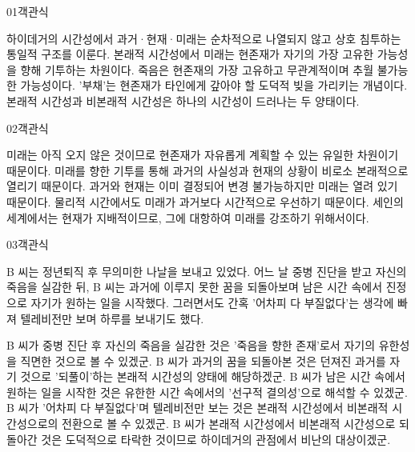 \documentclass[fs85,seriesWit]{korfarm-base}
\begin{document}
\kfBeginMC
\begin{kfQBlock}{01}{객관식}
\begin{kfChoices}
\kfChoice 하이데거의 시간성에서 과거·현재·미래는 순차적으로 나열되지 않고 상호 침투하는 통일적 구조를 이룬다.
\kfChoice 본래적 시간성에서 미래는 현존재가 자기의 가장 고유한 가능성을 향해 기투하는 차원이다.
\kfChoice 죽음은 현존재의 가장 고유하고 무관계적이며 추월 불가능한 가능성이다.
\kfChoice '부채'는 현존재가 타인에게 갚아야 할 도덕적 빚을 가리키는 개념이다.
\kfChoice 본래적 시간성과 비본래적 시간성은 하나의 시간성이 드러나는 두 양태이다.
\end{kfChoices}
\end{kfQBlock}

\begin{kfQBlock}{02}{객관식}
\begin{kfChoices}
\kfChoice 미래는 아직 오지 않은 것이므로 현존재가 자유롭게 계획할 수 있는 유일한 차원이기 때문이다.
\kfChoice 미래를 향한 기투를 통해 과거의 사실성과 현재의 상황이 비로소 본래적으로 열리기 때문이다.
\kfChoice 과거와 현재는 이미 결정되어 변경 불가능하지만 미래는 열려 있기 때문이다.
\kfChoice 물리적 시간에서도 미래가 과거보다 시간적으로 우선하기 때문이다.
\kfChoice 세인의 세계에서는 현재가 지배적이므로, 그에 대항하여 미래를 강조하기 위해서이다.
\end{kfChoices}
\end{kfQBlock}

\begin{kfQBlock}{03}{객관식}
\begin{kfEvidence}B 씨는 정년퇴직 후 무의미한 나날을 보내고 있었다. 어느 날 중병 진단을 받고 자신의 죽음을 실감한 뒤, B 씨는 과거에 이루지 못한 꿈을 되돌아보며 남은 시간 속에서 진정으로 자기가 원하는 일을 시작했다. 그러면서도 간혹 '어차피 다 부질없다'는 생각에 빠져 텔레비전만 보며 하루를 보내기도 했다.\end{kfEvidence}
\begin{kfChoices}
\kfChoice B 씨가 중병 진단 후 자신의 죽음을 실감한 것은 '죽음을 향한 존재'로서 자기의 유한성을 직면한 것으로 볼 수 있겠군.
\kfChoice B 씨가 과거의 꿈을 되돌아본 것은 던져진 과거를 자기 것으로 '되풀이'하는 본래적 시간성의 양태에 해당하겠군.
\kfChoice B 씨가 남은 시간 속에서 원하는 일을 시작한 것은 유한한 시간 속에서의 '선구적 결의성'으로 해석할 수 있겠군.
\kfChoice B 씨가 '어차피 다 부질없다'며 텔레비전만 보는 것은 본래적 시간성에서 비본래적 시간성으로의 전환으로 볼 수 있겠군.
\kfChoice B 씨가 본래적 시간성에서 비본래적 시간성으로 되돌아간 것은 도덕적으로 타락한 것이므로 하이데거의 관점에서 비난의 대상이겠군.
\end{kfChoices}
\end{kfQBlock}
\end{document}
